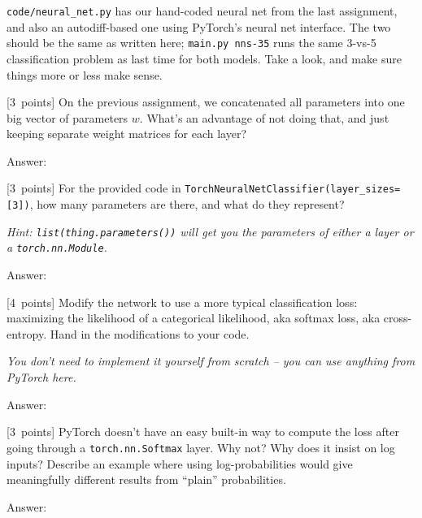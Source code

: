 \documentclass{article}
\newcommand{\ask}[1]{\textcolor{question}{#1}}
\newenvironment{answer}{\par\begingroup\color{answer}Answer: }{\endgroup}
\newcommand{\pts}[1]{\textcolor{points}{[#1~points]}}
\newcommand{\hint}[1]{\textcolor{black!60!white}{\emph{Hint: #1}}}
\newcommand{\meta}[1]{\textcolor{black!60!white}{\emph{#1}}}
\newcommand{\TODO}{\color{red}{TODO}}
\begin{document}
\texttt{code/neural\_net.py} has our hand-coded neural net from the last assignment, and also an autodiff-based one using PyTorch's neural net interface. The two should be the same as written here; \texttt{main.py nns-35} runs the same 3-vs-5 classification problem as last time for both models. Take a look, and make sure things more or less make sense.

\begin{qlist}

\item \pts{3}
    On the previous assignment, we concatenated all parameters into one big vector of parameters $w$. 
    \ask{What's an advantage of not doing that, and just keeping separate weight matrices for each layer?}

\begin{answer}\TODO\end{answer}

\item \pts{3}
    For the provided code in \texttt{TorchNeuralNetClassifier(layer\_sizes=[3])}, \ask{how many parameters are there, and what do they represent?}

\hint{\texttt{list(thing.parameters())} will get you the parameters of either a layer or a \texttt{torch.nn.Module}.}

\begin{answer}\TODO\end{answer}

\item \pts{4} Modify the network to use a more typical classification loss: maximizing the likelihood of a categorical likelihood, aka softmax loss, aka cross-entropy. \ask{Hand in the modifications to your code.}

\meta{You don't need to implement it yourself from scratch -- you can use anything from PyTorch here.}

\begin{answer}\TODO\end{answer}


\item \pts{3} PyTorch doesn't have an easy built-in way to compute the loss after going through a \texttt{torch.nn.Softmax} layer. \ask{Why not? Why does it insist on log inputs? Describe an example where using log-probabilities would give meaningfully different results from ``plain'' probabilities.}

\begin{answer}\TODO\end{answer}


\end{qlist}
\end{document}
